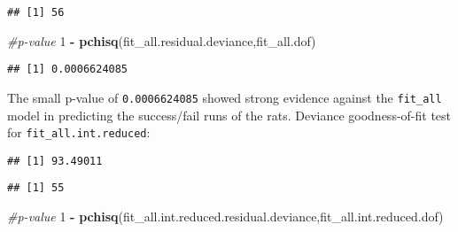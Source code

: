 \documentclass[
]{article}
\newenvironment{Shaded}{\begin{snugshade}}{\end{snugshade}}
\newcommand{\CommentTok}[1]{\textcolor[rgb]{0.56,0.35,0.01}{\textit{#1}}}
\newcommand{\DecValTok}[1]{\textcolor[rgb]{0.00,0.00,0.81}{#1}}
\newcommand{\FunctionTok}[1]{\textcolor[rgb]{0.13,0.29,0.53}{\textbf{#1}}}
\newcommand{\NormalTok}[1]{#1}
\newcommand{\OtherTok}[1]{\textcolor[rgb]{0.56,0.35,0.01}{#1}}
\newcommand{\SpecialCharTok}[1]{\textcolor[rgb]{0.81,0.36,0.00}{\textbf{#1}}}
\begin{document}
\begin{verbatim}
## [1] 56
\end{verbatim}

\begin{Shaded}
\begin{Highlighting}[]
\CommentTok{\#p{-}value}
\DecValTok{1} \SpecialCharTok{{-}} \FunctionTok{pchisq}\NormalTok{(fit\_all.residual.deviance,fit\_all.dof)}
\end{Highlighting}
\end{Shaded}

\begin{verbatim}
## [1] 0.0006624085
\end{verbatim}

The small p-value of \texttt{0.0006624085} showed strong evidence
against the \texttt{fit\_all} model in predicting the success/fail runs
of the rats. Deviance goodness-of-fit test for
\texttt{fit\_all.int.reduced}:

\begin{Shaded}
\end{Shaded}

\begin{verbatim}
## [1] 93.49011
\end{verbatim}

\begin{Shaded}
\end{Shaded}

\begin{verbatim}
## [1] 55
\end{verbatim}

\begin{Shaded}
\begin{Highlighting}[]
\CommentTok{\#p{-}value}
\DecValTok{1} \SpecialCharTok{{-}} \FunctionTok{pchisq}\NormalTok{(fit\_all.int.reduced.residual.deviance,fit\_all.int.reduced.dof)}
\end{Highlighting}
\end{Shaded}
\end{document}

